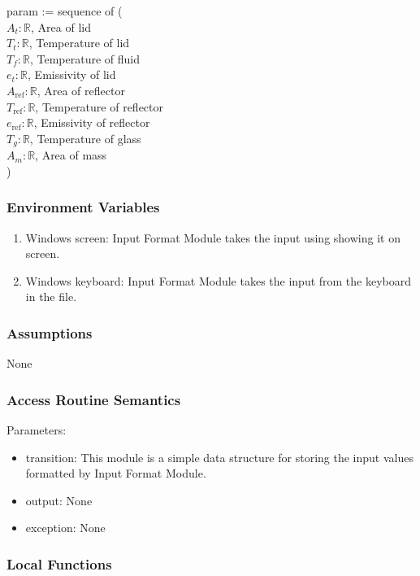 \documentclass[12pt, titlepage]{article}
\begin{document}
param := sequence of ( \\
$A_t: \mathbb{R}$, Area of lid \\
$T_t: \mathbb{R}$, Temperature of lid \\ 
$T_f: \mathbb{R}$, Temperature of fluid \\
$e_t: \mathbb{R}$, Emissivity of lid \\
$A_\text{ref}: \mathbb{R}$, Area of reflector \\
$T_\text{ref}: \mathbb{R}$, Temperature of reflector  \\
$e_\text{ref}: \mathbb{R}$, Emissivity of reflector  \\
$T_g: \mathbb{R}$, Temperature of glass   \\ 
$A_m: \mathbb{R}$, Area of mass 
\\ )

\subsubsection{Environment Variables}

\begin{enumerate}
    \item Windows screen: Input Format Module takes the input using showing it on screen.
    \item Windows keyboard: Input Format Module takes the input from the keyboard in the file. 
\end{enumerate}

\subsubsection{Assumptions}

None

\subsubsection{Access Routine Semantics}

\noindent Parameters:
\begin{itemize}
\item transition: This module is a simple data structure for storing the input values formatted by Input Format Module. 
\item output: None
\item exception: None
\end{itemize}


\subsubsection{Local Functions}
\end{document}
